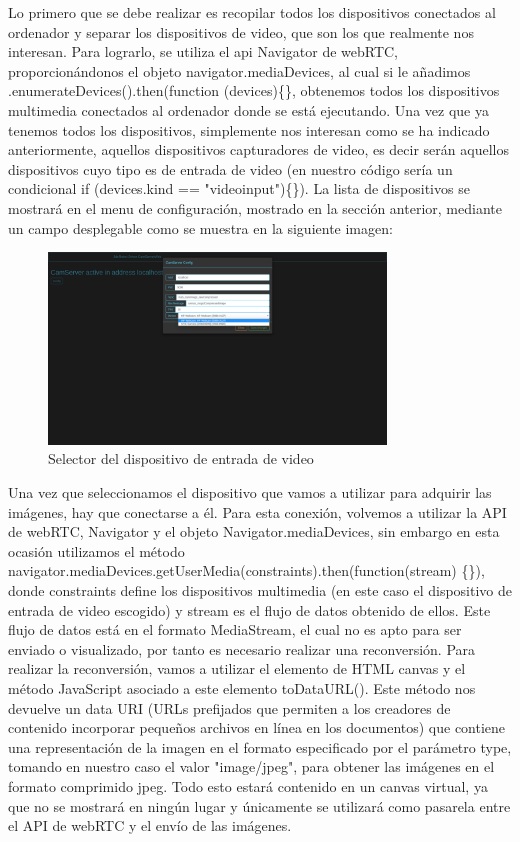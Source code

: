Lo primero que se debe realizar es recopilar todos los dispositivos conectados al ordenador y separar los dispositivos de video, que son los que realmente nos interesan. Para lograrlo, se utiliza el api Navigator de webRTC, proporcionándonos el objeto navigator.mediaDevices, al cual si le añadimos .enumerateDevices().then(function (devices)\{\}, obtenemos todos los dispositivos multimedia conectados al ordenador donde se está ejecutando. Una vez que ya tenemos todos los dispositivos, simplemente nos interesan como se ha indicado anteriormente, aquellos dispositivos capturadores de video, es decir serán aquellos dispositivos cuyo tipo es de entrada de video (en nuestro código sería un condicional if (devices.kind == "videoinput")\{\}). La lista de dispositivos se mostrará en el menu de configuración, mostrado en la sección anterior, mediante un campo desplegable como se muestra en la siguiente imagen:
 \begin{figure}[H]
  \begin{center}
    \includegraphics[width=0.8\textwidth]{figures/devicecamserver.png}
		\caption{Selector del dispositivo de entrada de video}
		\label{fig.devicecamserver}
		\end{center}
\end{figure}
Una vez que seleccionamos el dispositivo que vamos a utilizar para adquirir las imágenes, hay que conectarse a él. Para esta conexión, volvemos a utilizar la API de webRTC, Navigator y el objeto Navigator.mediaDevices, sin embargo en esta ocasión utilizamos el método navigator.mediaDevices.getUserMedia(constraints).then(function(stream) \{\}), donde constraints define los dispositivos multimedia (en este caso el dispositivo de entrada de video escogido) y stream es el flujo de datos obtenido de ellos.
Este flujo de datos está en el formato MediaStream, el cual no es apto para ser enviado o visualizado, por tanto es necesario realizar una reconversión. Para realizar la reconversión, vamos a utilizar el elemento de HTML canvas y el método JavaScript asociado a este elemento toDataURL(). Este método nos devuelve un data URI (URLs prefijados que permiten a los creadores de contenido incorporar pequeños archivos en línea en los documentos) que contiene una representación de la imagen en el formato especificado por el parámetro type, tomando en nuestro caso el valor "image/jpeg", para obtener las imágenes en el formato comprimido jpeg. Todo esto estará contenido en un canvas virtual, ya que no se mostrará en ningún lugar y únicamente se utilizará como pasarela entre el API de webRTC y el envío de las imágenes.

